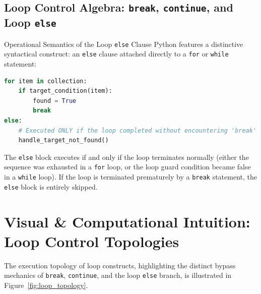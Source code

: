 \subsection{Loop Control Algebra: \texttt{break}, \texttt{continue}, and Loop \texttt{else}}

\begin{theorembox}{Operational Semantics of the Loop \texttt{else} Clause}
Python features a distinctive syntactical construct: an \texttt{else} clause attached directly to a \texttt{for} or \texttt{while} statement:
\begin{lstlisting}[language=Python]
for item in collection:
    if target_condition(item):
        found = True
        break
else:
    # Executed ONLY if the loop completed without encountering 'break'
    handle_target_not_found()
\end{lstlisting}
The \texttt{else} block executes if and only if the loop terminates normally (either the sequence was exhausted in a \texttt{for} loop, or the loop guard condition became false in a \texttt{while} loop). If the loop is terminated prematurely by a \texttt{break} statement, the \texttt{else} block is entirely skipped.
\end{theorembox}

\section{Visual \& Computational Intuition: Loop Control Topologies}

The execution topology of loop constructs, highlighting the distinct bypass mechanics of \texttt{break}, \texttt{continue}, and the loop \texttt{else} branch, is illustrated in Figure~\ref{fig:loop_topology}.


